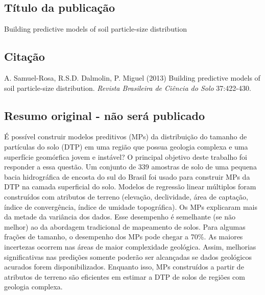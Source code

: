 \subsection{Título da publicação}
Building predictive models of soil particle-size distribution
\subsection{Citação}
A. Samuel-Rosa, R.S.D. Dalmolin, P. Miguel (2013) Building predictive models of soil particle-size distribution. {\em Revista Brasileira de Ciência do Solo} 37:422-430.
\subsection{Resumo original - não será publicado}
É possível construir modelos preditivos (MPs) da distribuição do tamanho de partículas do solo (DTP) em uma região que possua geologia complexa e uma superfície geomórfica jovem e instável? O principal objetivo deste trabalho foi responder a essa questão. Um conjunto de 339 amostras de solo de uma pequena bacia hidrográfica de encosta do sul do Brasil foi usado para construir MPs da DTP na camada superficial do solo. Modelos de regressão linear múltiplos foram construídos com atributos de terreno (elevação, declividade, área de captação, índice de convergência, índice de umidade topográfica). Os MPs explicaram mais da metade da variância dos dados. Esse desempenho é semelhante (se não melhor) ao da abordagem tradicional de mapeamento de solos. Para algumas frações de tamanho, o desempenho dos MPs pode chegar a 70\%. As maiores incertezas ocorrem nas áreas de maior complexidade geológica. Assim, melhorias significativas nas predições somente poderão ser alcançadas se dados geológicos acurados forem 
disponibilizados. Enquanto isso, MPs construídos a partir de atributos de terreno são eficientes em estimar a DTP de solos de regiões com geologia complexa.
